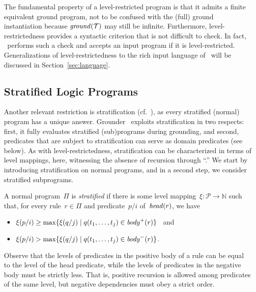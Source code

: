 The fundamental property of a level-restricted
program is that it admits a finite equivalent ground program, not to be confused with
the (full) ground instantiation because $\mathit{ground}(\mathcal{T})$ may still be infinite.
Furthermore, level-restrictedness provides a syntactic criterion that is not
difficult to check.
In fact, \gringo\ performs such a check and accepts an input program if it is level-restricted.
Generalizations of level-restrictedness to the rich input language of \gringo\
will be discussed in Section~\ref{sec:language}.


\subsection{Stratified Logic Programs}\label{subsec:strat}

Another relevant restriction is stratification (cf.~\cite{minker88}),
as every stratified (normal) program has a unique answer.
Grounder \gringo\ exploits stratification in two respects:
first, it fully evaluates stratified (sub)programs during grounding, and second,
predicates that are subject to stratification can serve as domain predicates (see below).
As with level-restrictedness, stratification can be characterized in terms
of level mappings, here, witnessing the absence of recursion through ``.''
We start by introducing stratification on normal programs, and in a second step,
we consider stratified subprograms.

A normal program~$\Pi$ is \emph{stratified}
if there is some level mapping~$\xi:\mathcal{P}\rightarrow\mathbb{N}$ such that,
for every rule~$r\in\Pi$ and predicate~$p/i$ of~$\mathit{head}(r)$, we have
\begin{itemize}
\item
$\xi(p/i)\geq\max\{\xi(q/j) \mid q(t_1,\dots,t_j)\in\mathit{body}^+(r)\}$ ~and
\item
$\xi(p/i)>   \max\{\xi(q/j) \mid q(t_1,\dots,t_j)\in\mathit{body}^-(r)\}$.
\end{itemize}
%
Observe that the levels of predicates in the positive body of a rule
can be equal to the level of the head predicate,
while the levels of predicates in the negative body must be strictly less.
That is, positive recursion is allowed among predicates of the same level,
but negative dependencies must obey a strict order.

